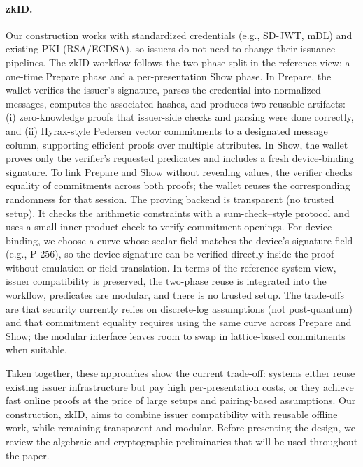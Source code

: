 \paragraph{zkID.}
Our construction works with standardized credentials (e.g., SD-JWT, mDL) and existing PKI (RSA/ECDSA), so issuers do not need to change their issuance pipelines.
The zkID workflow follows the two-phase split in the reference view: a one-time Prepare phase and a per-presentation Show phase.
In Prepare, the wallet verifies the issuer’s signature, parses the credential into normalized messages, computes the associated hashes, and produces two reusable artifacts: (i) zero-knowledge proofs that issuer-side checks and parsing were done correctly, and (ii) Hyrax-style Pedersen vector commitments to a designated message column, supporting efficient proofs over multiple attributes.
In Show, the wallet proves only the verifier’s requested predicates and includes a fresh device-binding signature. To link Prepare and Show without revealing values, the verifier checks equality of commitments across both proofs; the wallet reuses the corresponding randomness for that session.
The proving backend is transparent (no trusted setup). It checks the arithmetic constraints with a sum-check–style protocol and uses a small inner-product check to verify commitment openings. For device binding, we choose a curve whose scalar field matches the device’s signature field (e.g., P-256), so the device signature can be verified directly inside the proof without emulation or field translation. 
In terms of the reference system view, issuer compatibility is preserved, the two-phase reuse is integrated into the workflow, predicates are modular, and there is no trusted setup. The trade-offs are that security currently relies on discrete-log assumptions (not post-quantum) and that commitment equality requires using the same curve across Prepare and Show; the modular interface leaves room to swap in lattice-based commitments when suitable.

Taken together, these approaches show the current trade-off: systems either reuse existing issuer infrastructure but pay high per-presentation costs, or they achieve fast online proofs at the price of large setups and pairing-based assumptions. Our construction, zkID, aims to combine issuer compatibility with reusable offline work, while remaining transparent and modular. Before presenting the design, we review the algebraic and cryptographic preliminaries that will be used throughout the paper.
